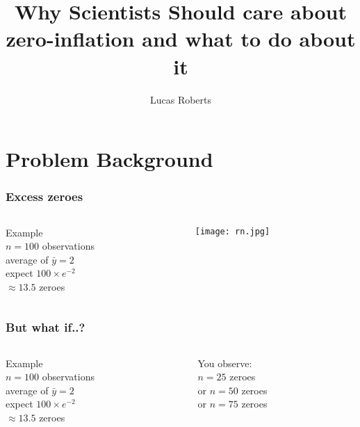 \documentclass{beamer} %
\title{Why Scientists Should care about zero-inflation and what to do about it}
\author{Lucas Roberts}
\institute{The Hartford Insurance}
\theoremstyle{definition} %
\begin{document}
\begin{frame} 
\titlepage
\end{frame}

\section{Problem Background} %

\begin{frame} 
\frametitle{Excess zeroes}

\begin{columns} %
\begin{column}{0.5\textwidth} %
Example\\
\pause 
$n=100$ observations\\
\pause
average of $\bar{y} = 2$ \\
\pause 
expect $100\times e^{-2}$ \\
\pause 
$\approx 13.5$ zeroes 
\pause
\end{column}
\begin{column}{0.5\textwidth} %
\begin{figure}[htb]
\texttt{[image: rn.jpg]}
\end{figure}
\end{column}
\end{columns}
\end{frame}

\begin{frame} 
\frametitle{But what if..? }
\begin{columns} %
\begin{column}{0.5\textwidth} %
Example\\
$n=100$ observations\\
average of $\bar{y} = 2$ \\
expect $100\times e^{-2}$ \\
$\approx 13.5$ zeroes 
\end{column}
\begin{column}{0.5\textwidth} 
You observe: \\
\pause
$n=25$ zeroes \\
\pause
or $n=50$ zeroes \\
\pause
or $n=75$ zeroes \\
\end{column}
\end{columns}
\end{frame}
\end{document}
